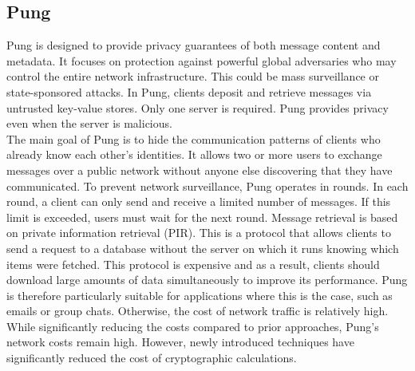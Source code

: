 \documentclass[a4paper]{article}
\begin{document}
\subsection{Pung} 
Pung \citep{Angel2016} is designed to provide privacy guarantees of both message content and metadata. It focuses on protection against powerful global adversaries who may control the entire network infrastructure. This could be mass surveillance or state-sponsored attacks. In Pung, clients deposit and retrieve messages via untrusted key-value stores. Only one server is required. Pung provides privacy even when the server is malicious.  \\
The main goal of Pung is to hide the communication patterns of clients who already know each other's identities. It allows two or more users to exchange messages over a public network without anyone else discovering that they have communicated. To prevent network surveillance, Pung operates in rounds. In each round, a client can only send and receive a limited number of messages. If this limit is exceeded, users must wait for the next round. Message retrieval is based on private information retrieval (PIR). This is a protocol that allows clients to send a request to a database without the server on which it runs knowing which items were fetched. This protocol is expensive and as a result, clients should download large amounts of data simultaneously to improve its performance. Pung is therefore particularly suitable for applications where this is the case, such as emails or group chats. Otherwise, the cost of network traffic is relatively high.\\
While significantly reducing the costs compared to prior approaches, Pung's network costs remain high. However, newly introduced techniques have significantly reduced the cost of cryptographic calculations.
\end{document}
